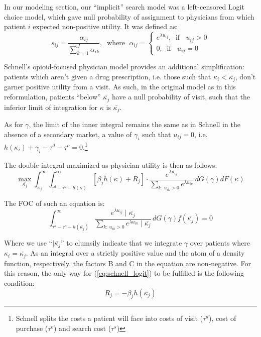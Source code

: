 \documentclass[../main.tex]{subfiles}
\begin{document}
In our modeling section, our ``implicit'' search model was a left-censored Logit choice model, which gave null probability of assignment to physicians from which patient $i$ expected non-positive utility. It was defined as:
\[
s_{ij} = \frac{\alpha_{ij}}{\sum_{k = 1}^{J} \alpha_{ik}}, \; \; \text{where } \; \alpha_{ij} = \begin{cases}
e^{\lambda u_{ij}}, \; \; \text{if } \; \; u_{ij} > 0 \\
0 , \; \; \text{if } \; \; u_{ij} = 0
\end{cases}
\]

Schnell's opioid-focused physician model provides an additional simplification: patients which aren't given a drug prescription, i.e. those such that $\kappa_i < \bar{\kappa_j}$, don't garner positive utility from a visit. As such, in the original model as in this reformulation, patients ``below'' $\bar{\kappa_j}$ have a null probability of visit, such that the inferior limit of integration for $\kappa$ is $\bar{\kappa_j}$.

As for $\gamma$, the limit of the inner integral remains the same as in Schnell in the absence of a secondary market, a value of $\gamma_i$ such that $u_{ij} = 0$, i.e. $h(\kappa_i) + \gamma_i - \tau^d - \tau^o = 0$.\footnote{Schnell splits the costs a patient will face into costs of visit ($\tau^d$), cost of purchase ($\tau^o$) and search cost ($\tau^s$)}

The double-integral maximized as physician utility is then as follows:
\[
\max_{\bar{\kappa_j}}\int_{\bar{\kappa_j}}^{\infty} \int_{\tau^d - \tau^o - h(\kappa)}^{\infty} [\beta_j h(\kappa) + R_j] \cdot \frac{e^{\lambda u_{ij}}}{\sum \limits_{k : \, u_{ik} > 0} e^{\lambda u_{ik}}} \, dG(\gamma) dF(\kappa)
\]

The FOC of such an equation is:
\begin{equation}
[\beta_j h(\bar{\kappa_j}) + R_j]\int_{\tau^d - \tau^o - h(\bar{\kappa_j})}^{\infty} \frac{e^{\lambda u_{ij}} \mid \bar{\kappa_j}}{\sum \limits_{k : \, u_{ik} > 0} e^{\lambda u_{ik}} \mid \bar{\kappa_j}} \, dG(\gamma) f(\bar{\kappa_j}) = 0 
\label{eq:schnell_logit}
\end{equation}


Where we use ``$\mid \bar{\kappa_j}$'' to clumsily indicate that we integrate $\gamma$ over patients where $\kappa_i = \bar{\kappa_j}$. As an integral over a strictly positive value and the atom of a density function, respectively, the factors B and C in the equation are non-negative. For this reason, the only way for (\ref{eq:schnell_logit}) to be fulfilled is the following condition:
\begin{equation}
    R_j = - \beta_j h(\bar{\kappa_j})
    \label{eq:schnell_condition}
\end{equation}
\end{document}
